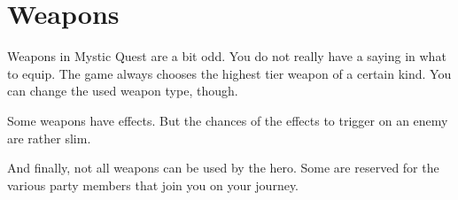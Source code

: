 \chapter{Weapons}

Weapons in Mystic Quest are a bit odd. You do not really have a saying in what to equip. The game always chooses the highest tier weapon of a certain kind. You can change the used weapon type, though.

Some weapons have effects. But the chances of the effects to trigger on an enemy are rather slim.

And finally, not all weapons can be used by the hero. Some are reserved for the various party members that join you on your journey.

\newpage

\newpage

\newpage

\newpage

\newpage

\newpage

\newpage

\newpage

\newpage

\newpage

\newpage

\newpage

\newpage

\newpage

\newpage


